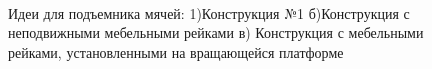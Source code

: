 \begin{enumerate}
\begin{enumerate}
\begin{enumerate}
\begin{enumerate}
	      \begin{figure}[H]
	      	\begin{minipage}[h]{0.2\linewidth}
	      		\center  
	      	\end{minipage}
	      	\begin{minipage}[h]{0.6\linewidth}
	      		\caption{Идеи для подъемника мячей: 1)Конструкция №1 б)Конструкция с неподвижными мебельными рейками в) Конструкция с мебельными рейками, установленными на вращающейся платформе}
	      	\end{minipage}
	      \end{figure}
	      

\end{enumerate}
\end{enumerate}
\end{enumerate}
\end{enumerate}
